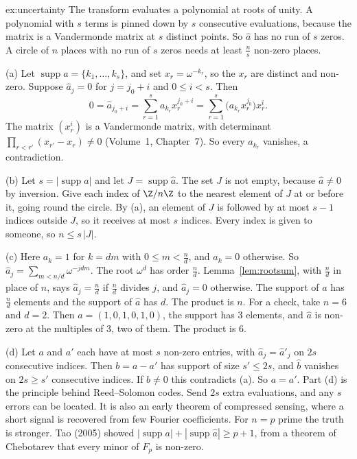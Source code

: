 \begin{solution}{ex:uncertainty}
\idea The transform evaluates a polynomial at roots of unity. A polynomial with $s$ terms is pinned down by $s$ consecutive evaluations, because the matrix is a Vandermonde matrix at $s$ distinct points. So $\hat a$ has no run of $s$ zeros. A circle of $n$ places with no run of $s$ zeros needs at least $\frac ns$ non-zero places.

\writeup (a) Let $\operatorname{supp}a=\{k_1,\ldots,k_s\}$, and set $x_r=\omega^{-k_r}$, so the $x_r$ are distinct and non-zero. Suppose $\hat a_j=0$ for $j=j_0+i$ and $0\le i<s$. Then
\[
0=\hat a_{j_0+i}=\sum_{r=1}^s a_{k_r}x_r^{j_0+i}=\sum_{r=1}^s\bigl(a_{k_r}x_r^{j_0}\bigr)x_r^i.
\]
The matrix $(x_r^i)$ is a Vandermonde matrix, with determinant $\prod_{r<r'}(x_{r'}-x_r)\ne0$ (Volume~1, Chapter~7). So every $a_{k_r}$ vanishes, a contradiction.

(b) Let $s=|\operatorname{supp}a|$ and let $J=\operatorname{supp}\hat a$. The set $J$ is not empty, because $\hat a\ne0$ by inversion. Give each index of $\Z/n\Z$ to the nearest element of $J$ at or before it, going round the circle. By (a), an element of $J$ is followed by at most $s-1$ indices outside $J$, so it receives at most $s$ indices. Every index is given to someone, so $n\le s\,|J|$.

(c) Here $a_k=1$ for $k=dm$ with $0\le m<\frac nd$, and $a_k=0$ otherwise. So $\hat a_j=\sum_{m<n/d}\omega^{-jdm}$. The root $\omega^d$ has order $\frac nd$. Lemma~\ref{lem:rootsum}, with $\frac nd$ in place of $n$, says $\hat a_j=\frac nd$ if $\frac nd$ divides $j$, and $\hat a_j=0$ otherwise. The support of $a$ has $\frac nd$ elements and the support of $\hat a$ has $d$. The product is $n$. For a check, take $n=6$ and $d=2$. Then $a=(1,0,1,0,1,0)$, the support has $3$ elements, and $\hat a$ is non-zero at the multiples of $3$, two of them. The product is $6$.

(d) Let $a$ and $a'$ each have at most $s$ non-zero entries, with $\hat a_j=\hat a'_j$ on $2s$ consecutive indices. Then $b=a-a'$ has support of size $s'\le2s$, and $\hat b$ vanishes on $2s\ge s'$ consecutive indices. If $b\ne0$ this contradicts (a). So $a=a'$.
\leads Part (d) is the principle behind Reed--Solomon codes. Send $2s$ extra evaluations, and any $s$ errors can be located. It is also an early theorem of compressed sensing, where a short signal is recovered from few Fourier coefficients. For $n=p$ prime the truth is stronger. Tao (2005) showed $|\operatorname{supp}a|+|\operatorname{supp}\hat a|\ge p+1$, from a theorem of Chebotarev that every minor of $F_p$ is non-zero.
\end{solution}

